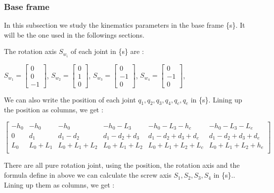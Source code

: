 \subsubsection{Base frame}

\hspace{\parindent} In this subsection we study the kinematics parameters in the base frame \{s\}. It will be the one used in the followings sections.

\bigbreak

The rotation axis $S_{w_i}$ of each joint  in \{s\} are : 
\begin{center}
    $S_{w_1} = \begin{bmatrix} 0 \\ 0 \\ -1\end{bmatrix}$,
    $S_{w_2} = \begin{bmatrix} 0 \\ 1 \\ 0\end{bmatrix}$,
    $S_{w_3} = \begin{bmatrix} 0 \\ -1 \\ 0\end{bmatrix}$,
    $S_{w_4} = \begin{bmatrix} 0 \\ -1 \\ 0\end{bmatrix}$,
\end{center}

\bigbreak

We can also write the position of each joint  $q_1,q_2,q_3,q_4,q_c,q_e$ in \{s\}. Lining up the position as columns, we get : 

\begin{center}
    $
    \begin{bmatrix}
        -h_0 & -h_0 & -h_0 & -h_0-L_3 & -h_0-L_3-h_c & -h_0-L_3-L_e  \\
        0 & d_1 & d_1-d_2 & d_1-d_2+d_3 & d_1-d_2+d_3+d_c & d_1-d_2+d_3+d_e \\
        L_0 & L_0+L_1 & L_0+L_1+L_2 & L_0+L_1+L_2 & L_0+L_1+L_2+L_c & L_0+L_1+L_2+h_e \\
    \end{bmatrix}
    $
\end{center}

\bigbreak

There are all pure rotation joint, using the position, the rotation axis and the formula define in above we can calculate the screw axis $S_1,S_2,S_3,S_4$ in \{s\}.. Lining up them as columns, we get : 

